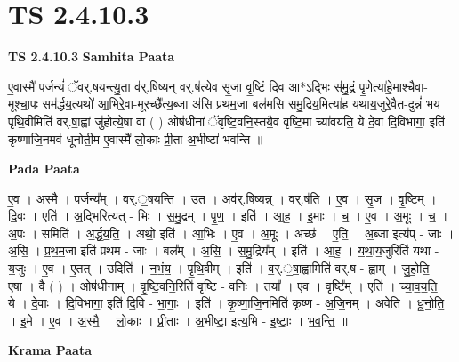 \documentclass[17pt]{extarticle}
\begin{document}
\section*{ TS 2.4.10.3 }

\textbf{TS 2.4.10.3 } \newline
\textbf{Samhita Paata} \newline

ए॒वास्मै॑ प॒र्जन्यं॑ ॅवर्.षयन्त्यु॒ता व॑र्.षिष्य॒न् वर्.ष॑त्ये॒व सृ॒जा वृ॒ष्टिं दि॒व आ*ऽद्भिः स॑मु॒द्रं पृ॒णेत्या॑हे॒माश्चै॒वा-मूश्चा॒पः सम॑र्द्धय॒त्यथो॑ आ॒भिरे॒वा-मूरच्छै᳚त्य॒ब्जा अ॑सि प्रथम॒जा बल॑मसि समु॒द्रिय॒मित्या॑ह यथाय॒जुरे॒वैत-दुन्नं॑ भय पृथि॒वीमिति॑ वर्.षा॒ह्वां जु॑होत्ये॒षा वा ( ) ओष॑धीनां ॅवृष्टि॒वनि॒स्तयै॒व वृष्टि॒मा च्या॑वयति॒ ये दे॒वा दि॒विभा॑गा॒ इति॑ कृष्णाजि॒नमव॑ धूनोती॒म ए॒वास्मै॑ लो॒काः प्री॒ता अ॒भीष्टा॑ भवन्ति ॥ \newline

\textbf{Pada Paata} \newline

ए॒व । अ॒स्मै॒ । प॒र्जन्य᳚म् । व॒र्.॒ष॒य॒न्ति॒ । उ॒त । अव॑र्.षिष्यन्न् । वर्.ष॑ति । ए॒व । सृ॒ज ।  वृ॒ष्टिम् । दि॒वः । एति॑ । अ॒द्भिरित्य॑त् - भिः । स॒मु॒द्रम् । पृ॒ण॒ । इति॑ । आ॒ह॒ । इ॒माः । च॒ । ए॒व । अ॒मूः । च॒ । अ॒पः । समिति॑ । अ॒र्द्ध॒य॒ति॒ । अथो॒ इति॑ । आ॒भिः । ए॒व । अ॒मूः । अच्छ॑ । ए॒ति॒ । अ॒ब्जा इत्य॑प् - जाः । अ॒सि॒ । प्र॒थ॒म॒जा इति॑ प्रथम - जाः । बल᳚म् । अ॒सि॒ । स॒मु॒द्रिय᳚म् । इति॑ । आ॒ह॒ । य॒था॒य॒जुरिति॑ यथा - य॒जुः । ए॒व । ए॒तत् । उदिति॑ । न॒भं॒य॒ । पृ॒थि॒वीम् । इति॑ । व॒र्.॒षा॒ह्वामिति॑ वर्.ष - ह्वाम् । जु॒हो॒ति॒ । ए॒षा । वै ( ) । ओष॑धीनाम् । वृ॒ष्टि॒वनि॒रिति॑ वृष्टि - वनिः॑ । तया᳚ । ए॒व । वृष्टि᳚म् । एति॑ । च्या॒व॒य॒ति॒ । ये । दे॒वाः । दि॒विभा॑गा॒ इति॑ दि॒वि - भा॒गाः॒ । इति॑ । कृ॒ष्णा॒जि॒नमिति॑ कृष्ण - अ॒जि॒नम् । अवेति॑ । धू॒नो॒ति॒ । इ॒मे । ए॒व । अ॒स्मै॒ । लो॒काः । प्री॒ताः । अ॒भीष्टा॒ इत्य॒भि - इ॒ष्टाः॒ । भ॒व॒न्ति॒ ॥  \newline


\textbf{Krama Paata} \newline
\end{document}
